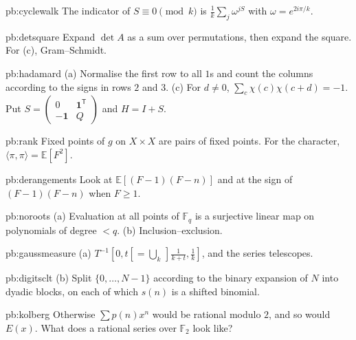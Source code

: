 \begin{hint}{pb:cyclewalk}
The indicator of $S\equiv0\pmod k$ is $\frac1k\sum_j\omega^{jS}$ with $\omega=e^{2i\pi/k}$.
\end{hint}

\begin{hint}{pb:detsquare}
Expand $\det A$ as a sum over permutations, then expand the square. For (c), Gram--Schmidt.
\end{hint}

\begin{hint}{pb:hadamard}
(a) Normalise the first row to all $1$s and count the columns according to the signs in rows $2$ and $3$. (c) For $d\ne0$,
$\sum_c\chi(c)\chi(c+d)=-1$. Put $S=\begin{pmatrix}0&\mathbf1^{\mathsf T}\\-\mathbf1&Q\end{pmatrix}$ and $H=I+S$.
\end{hint}

\begin{hint}{pb:rank}
Fixed points of $g$ on $X\times X$ are pairs of fixed points. For the character, $\langle\pi,\pi\rangle=\mathbb E[F^2]$.
\end{hint}

\begin{hint}{pb:derangements}
Look at $\mathbb E[(F-1)(F-n)]$ and at the sign of $(F-1)(F-n)$ when $F\ge1$.
\end{hint}

\begin{hint}{pb:noroots}
(a) Evaluation at all points of $\mathbb F_q$ is a surjective linear map on polynomials of degree $<q$. (b) Inclusion--exclusion.
\end{hint}

\begin{hint}{pb:gaussmeasure}
(a) $T^{-1}[0,t[=\bigcup_k\,]\frac1{k+t},\frac1k]$, and the series telescopes.
\end{hint}

\begin{hint}{pb:digitsclt}
(b) Split $\{0,\dots,N-1\}$ according to the binary expansion of $N$ into dyadic blocks, on each of which $s(n)$ is a shifted
binomial.
\end{hint}

\begin{hint}{pb:kolberg}
Otherwise $\sum p(n)x^n$ would be rational modulo $2$, and so would $E(x)$. What does a rational series over $\mathbb F_2$ look
like?
\end{hint}

